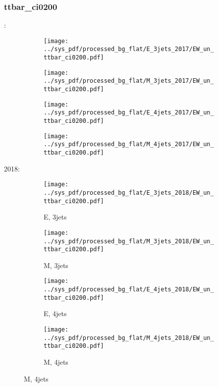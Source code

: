\documentclass{beamer}
\begin{document}
\begin{frame}
\frametitle{ttbar_ci0200}
\fontsize{5}{1}:
\begin{figure}
\centering
\begin{subfigure}[b]{0.24\textwidth}
\texttt{[image: ../sys\_pdf/processed\_bg\_flat/E\_3jets\_2017/EW\_un\_ttbar\_ci0200.pdf]}
\end{subfigure}
\begin{subfigure}[b]{0.24\textwidth}
\texttt{[image: ../sys\_pdf/processed\_bg\_flat/M\_3jets\_2017/EW\_un\_ttbar\_ci0200.pdf]}
\end{subfigure}
\begin{subfigure}[b]{0.24\textwidth}
\texttt{[image: ../sys\_pdf/processed\_bg\_flat/E\_4jets\_2017/EW\_un\_ttbar\_ci0200.pdf]}
\end{subfigure}
\begin{subfigure}[b]{0.24\textwidth}
\texttt{[image: ../sys\_pdf/processed\_bg\_flat/M\_4jets\_2017/EW\_un\_ttbar\_ci0200.pdf]}
\end{subfigure}
\end{figure}
2018:
\begin{figure}
\centering
\begin{subfigure}[b]{0.24\textwidth}
\texttt{[image: ../sys\_pdf/processed\_bg\_flat/E\_3jets\_2018/EW\_un\_ttbar\_ci0200.pdf]}
\captionsetup{font=tiny}
\caption{E, 3jets}
\end{subfigure}
\begin{subfigure}[b]{0.24\textwidth}
\texttt{[image: ../sys\_pdf/processed\_bg\_flat/M\_3jets\_2018/EW\_un\_ttbar\_ci0200.pdf]}
\captionsetup{font=tiny}
\caption{M, 3jets}
\end{subfigure}
\begin{subfigure}[b]{0.24\textwidth}
\texttt{[image: ../sys\_pdf/processed\_bg\_flat/E\_4jets\_2018/EW\_un\_ttbar\_ci0200.pdf]}
\captionsetup{font=tiny}
\caption{E, 4jets}
\end{subfigure}
\begin{subfigure}[b]{0.24\textwidth}
\texttt{[image: ../sys\_pdf/processed\_bg\_flat/M\_4jets\_2018/EW\_un\_ttbar\_ci0200.pdf]}
\captionsetup{font=tiny}
\caption{M, 4jets}
\end{subfigure}
\end{figure}
\end{frame}
\end{document}

